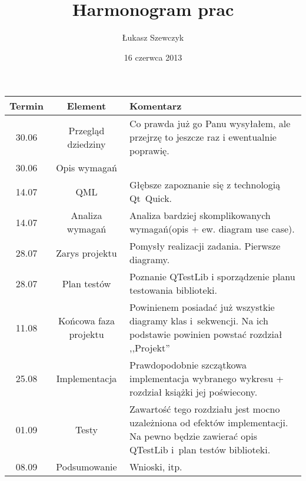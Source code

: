 \documentclass[11pt,twoside,a4paper,final]{article}
\begin{document}
\date{16 czerwca 2013}
\title{Harmonogram prac}

\author{Łukasz Szewczyk}

\maketitle

\begin{tabular}{|c|c|p{8cm}|}
\hline
Termin & Element & Komentarz\\
\hline
30.06 & Przegląd dziedziny & Co prawda już go Panu wysyłałem, 
ale przejrzę to jeszcze raz i ewentualnie poprawię. \\
\hline
30.06 & Opis wymagań &  \\
\hline
14.07 & QML & Głębsze zapoznanie się z technologią Qt~Quick. \\
\hline
14.07 & Analiza wymagań & Analiza bardziej skomplikowanych wymagań(opis + ew. diagram use case). \\
\hline
28.07 & Zarys projektu & Pomysły realizacji zadania. Pierwsze diagramy. \\
\hline
28.07 & Plan testów & Poznanie QTestLib i sporządzenie planu testowania biblioteki. \\
\hline
11.08 & Końcowa faza projektu & Powinienem posiadać już wszystkie diagramy klas i~sekwencji. Na ich podstawie powinien powstać rozdział ,,Projekt''\\
\hline
25.08 & Implementacja & Prawdopodobnie szczątkowa implementacja wybranego wykresu + rozdział książki jej poświecony. \\
\hline
01.09 & Testy & Zawartość tego rozdziału jest mocno uzależniona od efektów implementacji.
Na pewno będzie zawierać opis QTestLib i~plan testów biblioteki.  \\
\hline
08.09 & Podsumowanie & Wnioski, itp.\\
\hline
\end{tabular}
\end{document}
